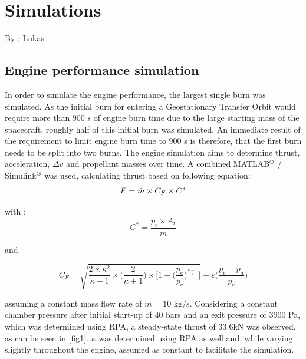 \chapter{Simulations}
\qquad \underline{By} : Lukas
\label{chap:sim}
\section{Engine performance simulation}
\qquad In order to simulate the engine performance, the largest single burn was simulated. As the initial burn for entering a Geostationary Transfer Orbit would require more than $900$ s of engine burn time due to the large starting mass of the spacecraft, roughly half of this initial burn was simulated. An immediate result of the requirement to limit engine burn time to $900$ s is therefore, that the first burn needs to be split into two burns. The engine simulation aims to determine thrust, acceleration, $\Delta v$ and propellant masses over time. A combined MATLAB$^{\mbox{\scriptsize{\textregistered}}}$  / Simulink$^{\mbox{\scriptsize{\textregistered}}}$  was used, calculating thrust based on following equation:
\begin{equation}
	F = \dot m \times C_F \times C^*\\
\end{equation}

with : 
$$
C^* = \frac{p_c\times A_t}{\dot{m}}
$$

and

$$
C_F = \sqrt{\frac{2\times \kappa^2}{\kappa - 1}\times \bigg(\frac{2}{\kappa + 1}\bigg)\times\bigg[1 - \bigg(\frac{p_e}{p_c}\bigg)^{\frac{\kappa - 1}{\kappa}}\bigg]} + \varepsilon\bigg(\frac{p_e-p_a}{p_c}\bigg)
$$

assuming a constant mass flow rate of $\dot{m} = 10$ kg/s. Considering a constant chamber pressure after initial start-up of $40$ bars and an exit pressure of $3900$ Pa, which was determined using RPA, a steady-state thrust of $33.6$kN was observed, as can be seen in \autoref{fig1}. $\kappa$ was determined using RPA as well and, while varying slightly throughout the engine, assumed as constant to facilitate the simulation.

